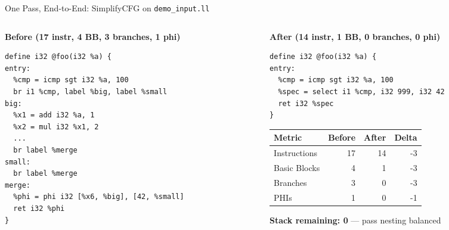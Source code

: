\documentclass[aspectratio=169]{beamer}
\newcommand{\red}[1]{\textcolor{LPTARed}{#1}}
\newcommand{\green}[1]{\textcolor{LPTAGreen}{#1}}
\begin{document}
\begin{frame}[fragile]{One Pass, End-to-End: SimplifyCFG on \texttt{demo\_input.ll}}
  \begin{columns}[T,onlytextwidth]
    \begin{column}{0.48\textwidth}
      \textbf{Before (17 instr, 4 BB, 3 branches, 1 phi)}
      \begin{lstlisting}[style=llvm]
define i32 @foo(i32 %a) {
entry:
  %cmp = icmp sgt i32 %a, 100
  br i1 %cmp, label %big, label %small
big:
  %x1 = add i32 %a, 1
  %x2 = mul i32 %x1, 2
  ...
  br label %merge
small:
  br label %merge
merge:
  %phi = phi i32 [%x6, %big], [42, %small]
  ret i32 %phi
}
      \end{lstlisting}
    \end{column}
    \begin{column}{0.48\textwidth}
      \textbf{After (14 instr, 1 BB, 0 branches, 0 phi)}
      \begin{lstlisting}[style=llvm]
define i32 @foo(i32 %a) {
entry:
  %cmp = icmp sgt i32 %a, 100
  %spec = select i1 %cmp, i32 999, i32 42
  ret i32 %spec
}
      \end{lstlisting}
      \vspace{0.5em}
      \begin{tabular}{lrrr}
        \toprule
        Metric & Before & After & \textbf{Delta} \\
        \midrule
        Instructions & 17 & 14 & \red{-3} \\
        Basic Blocks & 4 & 1 & \red{-3} \\
        Branches & 3 & 0 & \red{-3} \\
        PHIs & 1 & 0 & \red{-1} \\
        \bottomrule
      \end{tabular}
      \vspace{0.5em}
      \green{\textbf{Stack remaining: 0}} — pass nesting balanced
    \end{column}
  \end{columns}
\end{frame}
\end{document}
